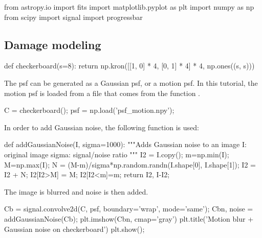 \def\QRCODE{TB_image_TUT.IMG.image_restoration_deblurring_pythonqrcode.png}
\def\QRPAGE{http://www.iptutorials.science/tree/master/TB_image/TUT.IMG.image_restoration_deblurring/python}

\begin{python}
from astropy.io import fits
import matplotlib.pyplot as plt
import numpy as np
from scipy import signal
import progressbar
\end{python}

\vspace*{-3pt}

\subsection{Damage modeling}

\begin{python}
def checkerboard(s=8):
    return np.kron([[1, 0] * 4, [0, 1] * 4] * 4, np.ones((s, s)))
\end{python}

The psf can be generated as a Gaussian psf, or a motion psf. In this tutorial, the motion psf is loaded from a file that comes from the \matlabregistered{} function .%
\begin{python}
C = checkerboard();
psf = np.load('psf_motion.npy');
\end{python}

In order to add Gaussian noise, the following function is used:
\begin{python}    
def addGaussianNoise(I, sigma=1000):
    """Adds Gaussian noise to an image
    I: original image
    sigma: signal/noise ratio
    """
    I2 = I.copy();
    m=np.min(I);
    M=np.max(I);
    N = (M-m)/sigma*np.random.randn(I.shape[0], I.shape[1]);
    I2 = I2 + N;
    I2[I2>M] = M;
    I2[I2<m]=m;
    return I2, I-I2;
\end{python}

The image is blurred and noise is then added.
\begin{python}
Cb = signal.convolve2d(C, psf, boundary='wrap', mode='same');
Cbn, noise = addGaussianNoise(Cb);
plt.imshow(Cbn, cmap='gray')
plt.title('Motion blur + Gaussian noise on checkerboard')
plt.show();
\end{python}

